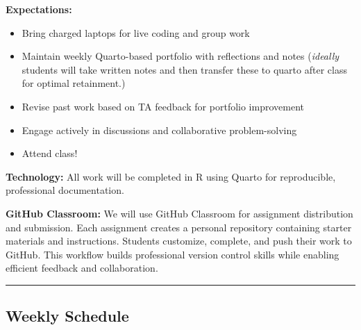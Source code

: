 \documentclass[
  11pt,
]{article}
\providecommand{\tightlist}{%
  \setlength{\itemsep}{0pt}\setlength{\parskip}{0pt}}
\begin{document}
\textbf{Expectations:}

\begin{itemize}
\tightlist
\item
  Bring charged laptops for live coding and group work
\item
  Maintain weekly Quarto-based portfolio with reflections and notes
  (\emph{ideally} students will take written notes and then transfer
  these to quarto after class for optimal retainment.)
\item
  Revise past work based on TA feedback for portfolio improvement
\item
  Engage actively in discussions and collaborative problem-solving
\item
  Attend class!
\end{itemize}

\textbf{Technology:} All work will be completed in R using Quarto for
reproducible, professional documentation.

\textbf{GitHub Classroom:} We will use GitHub Classroom for assignment
distribution and submission. Each assignment creates a personal
repository containing starter materials and instructions. Students
customize, complete, and push their work to GitHub. This workflow builds
professional version control skills while enabling efficient feedback
and collaboration.

\begin{center}\rule{0.5\linewidth}{0.5pt}\end{center}

\subsection{Weekly Schedule}\label{weekly-schedule}
\end{document}
